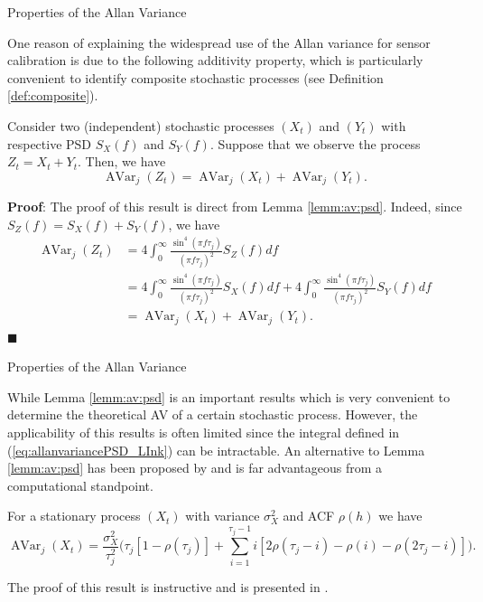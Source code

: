 \documentclass[envcountsect,usenames,dvipsnames]{beamer}
\DeclareMathOperator{\AV}{AVar}
\theoremstyle{mystyle}
\begin{document}
\begin{frame}{Properties of the Allan Variance}
\footnotesize

One reason of explaining the widespread use of the Allan variance for sensor calibration is due to the following additivity property, which is particularly convenient to identify composite stochastic processes (see Definition \ref{def:composite}).

\begin{Corollary}
\label{coro:add:av}
Consider two (independent) stochastic processes $(X_t)$ and $(Y_t)$ with respective PSD $S_X(f)$ and $S_Y(f)$. Suppose that we observe the process $Z_t = X_t + Y_t$. Then, we have
%
\begin{equation*}
    \AV_j \left(Z_t \right) = \AV_j \left(X_t \right) + \AV_j \left(Y_t \right).
\end{equation*}
%
\end{Corollary}

\textbf{Proof}: The proof of this result is direct from Lemma \ref{lemm:av:psd}. Indeed, since $S_Z(f) = S_X(f) + S_Y(f)$, we have
%
\begin{equation*}
    \begin{aligned}
    \AV_j \left(Z_t \right) &= 4  \int_0^{\infty}  \frac{\sin^4(\pi f \tau_j)}{(\pi f \tau_j)^2} S_{Z}(f) df\\
    &= 4  \int_0^{\infty}  \frac{\sin^4(\pi f \tau_j)}{(\pi f \tau_j)^2} S_{X}(f) df + 4  \int_0^{\infty}  \frac{\sin^4(\pi f \tau_j)}{(\pi f \tau_j)^2} S_{Y}(f) df\\
    &= \AV_j \left(X_t \right) + \AV_j \left(Y_t \right).
    \end{aligned}
\end{equation*}
 \hfill $\blacksquare$
%
\end{frame}

\begin{frame}{Properties of the Allan Variance}

While Lemma \ref{lemm:av:psd} is an important results which is very convenient to determine the theoretical AV of a certain stochastic process. However, the applicability of this results is often limited since the integral defined in (\ref{eq:allanvariancePSD_LInk}) can be intractable. An alternative to Lemma \ref{lemm:av:psd} has been proposed by \cite{zhang2008allan} and is far advantageous from a computational standpoint. 
%
\begin{Lemma}
\label{lemma:av:to:acf}
For a stationary process $(X_t)$ with variance $\sigma^2_X$ and ACF $\rho(h)$ we have
%
\begin{equation*}
\label{stat.av}
    \AV_j \left(X_t \right)  = \frac{\sigma_X^2}{\tau_j^2} \bigg(\tau_j\left[1-\rho(\tau_j)\right] 
   + \sum_{i=1}^{\tau_j-1} i \left[2 \rho(\tau_j-i) - \rho(i) - \rho(2\tau_j-i)\right]\bigg). 
\end{equation*}
\end{Lemma}
%
The proof of this result is instructive and is presented in \cite{xu2017study}.
\end{frame}
\end{document}
